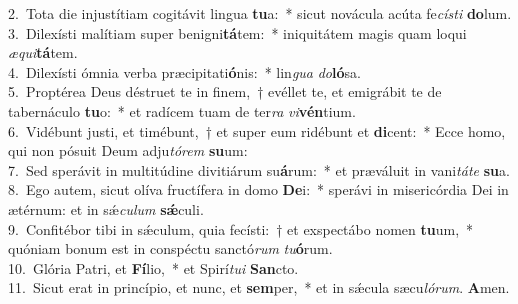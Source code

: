 {2.~}Tota die injustítiam cogitávit lingua \textbf{tu}a:~* sicut novácula acúta fe\textit{cí}\textit{sti} \textbf{do}lum.\\
{3.~}Dilexísti malítiam super benigni\textbf{tá}tem:~* iniquitátem magis quam loqui \textit{æ}\textit{qui}\textbf{tá}tem.\\
{4.~}Dilexísti ómnia verba præcipitati\textbf{ó}nis:~* lin\textit{gua} \textit{do}\textbf{ló}sa.\\
{5.~}Proptérea Deus déstruet te in finem,~† evéllet te, et emigrábit te de tabernáculo \textbf{tu}o:~* et radícem tuam de ter\textit{ra} \textit{vi}\textbf{vén}tium.\\
{6.~}Vidébunt justi, et timébunt,~† et super eum ridébunt et \textbf{di}cent:~* Ecce homo, qui non pósuit Deum adju\textit{tó}\textit{rem} \textbf{su}um:\\
{7.~}Sed sperávit in multitúdine divitiárum su\textbf{á}rum:~* et præváluit in vani\textit{tá}\textit{te} \textbf{su}a.\\
{8.~}Ego autem, sicut olíva fructífera in domo \textbf{De}i:~* sperávi in misericórdia Dei in ætérnum: et in sǽ\textit{cu}\textit{lum} \textbf{sǽ}culi.\\
{9.~}Confitébor tibi in sǽculum, quia fecísti:~† et exspectábo nomen \textbf{tu}um,~* quóniam bonum est in conspéctu sanctó\textit{rum} \textit{tu}\textbf{ó}rum.\\
{10.~}Glória Patri, et \textbf{Fí}lio,~* et Spirí\textit{tu}\textit{i} \textbf{San}cto.\\
{11.~}Sicut erat in princípio, et nunc, et \textbf{sem}per,~* et in sǽcula sæcu\textit{ló}\textit{rum}. \textbf{A}men.\\
